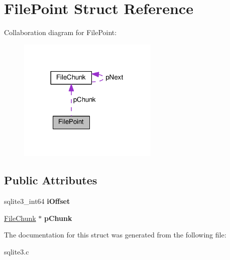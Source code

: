\hypertarget{structFilePoint}{}\section{File\+Point Struct Reference}
\label{structFilePoint}


Collaboration diagram for File\+Point\+:\nopagebreak
\begin{figure}[H]
\begin{center}
\leavevmode
\includegraphics[width=189pt]{structFilePoint__coll__graph}
\end{center}
\end{figure}
\subsection*{Public Attributes}
\begin{DoxyCompactItemize}
\item 
sqlite3\+\_\+int64 {\bfseries i\+Offset}\hypertarget{structFilePoint_a00a345e479cd37ebeb9e6ed475eb4112}{}\label{structFilePoint_a00a345e479cd37ebeb9e6ed475eb4112}

\item 
\hyperlink{structFileChunk}{File\+Chunk} $\ast$ {\bfseries p\+Chunk}\hypertarget{structFilePoint_aa17216d9d2559f14a00a2c72a8959298}{}\label{structFilePoint_aa17216d9d2559f14a00a2c72a8959298}

\end{DoxyCompactItemize}


The documentation for this struct was generated from the following file\+:\begin{DoxyCompactItemize}
\item 
sqlite3.\+c\end{DoxyCompactItemize}
